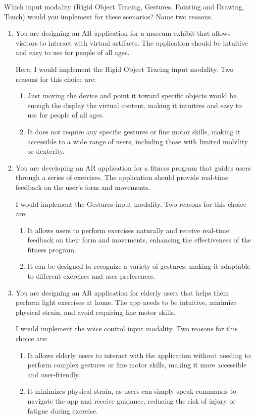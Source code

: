 \begin{ejercicio}
    Which input modality (Rigid Object Tracing, Gestures, Pointing and Drawing, Touch) would you implement for these scenarios? Name two reasons.
    \begin{enumerate}
        \item You are designing an AR application for a museum exhibit that allows visitors to interact with virtual artifacts. The application should be intuitive and easy to use for people of all ages.
        
        Here, I would implement the Rigid Object Tracing input modality. Two reasons for this choice are:
        \begin{enumerate}
            \item Just moving the device and point it toward specific objects would be enough the display the virtual content, making it intuitive and easy to use for people of all ages.
            \item It does not require any specific gestures or fine motor skills, making it accessible to a wide range of users, including those with limited mobility or dexterity.
        \end{enumerate}
        \item You are developing an AR application for a fitness program that guides users through a series of exercises. The application should provide real-time feedback on the user's form and movements.
        
        I would implement the Gestures input modality. Two reasons for this choice are:
        \begin{enumerate}
            \item It allows users to perform exercises naturally and receive real-time feedback on their form and movements, enhancing the effectiveness of the fitness program.
            \item It can be designed to recognize a variety of gestures, making it adaptable to different exercises and user preferences.
        \end{enumerate}

        \item You are designing an AR application for elderly users that helps them perform light exercises at home. The app needs to be intuitive, minimize physical strain, and avoid requiring fine motor skills.
        
        I would implement the voice control input modality. Two reasons for this choice are:
        \begin{enumerate}
            \item It allows elderly users to interact with the application without needing to perform complex gestures or fine motor skills, making it more accessible and user-friendly.
            \item It minimizes physical strain, as users can simply speak commands to navigate the app and receive guidance, reducing the risk of injury or fatigue during exercise.
        \end{enumerate}
    \end{enumerate}
\end{ejercicio}


